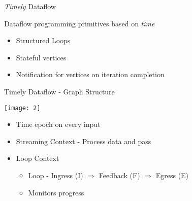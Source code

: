 \begin{frame}[t]{\emph{Timely} Dataflow}
  \begin{center}
    Dataflow programming primitives based on \emph{time}
  \end{center}

  \begin{itemize}
    \setlength\itemsep{0.15cm}
    \item Structured Loops
    \item Stateful vertices
    \item Notification for vertices on iteration completion
  \end{itemize}

  \vspace{0.25cm}
  \begin{center}
  \end{center}
\end{frame}

\begin{frame}[t]{Timely Dataflow - Graph Structure}
  \vspace{-0.5cm}
  \begin{center}
    \texttt{[image: 2]}
  \end{center}

  \vspace{-0.5cm}
  \begin{itemize}
    \setlength\itemsep{0.25cm}
    \item Time epoch on every input
    \item Streaming Context - Process data and pass
    \item Loop Context
    \begin{itemize}
      \setlength\itemsep{0.15cm}
      \item Loop - Ingress (I) $\Rightarrow$ Feedback (F) $\Rightarrow$ Egress (E)
      \item Monitors progress
    \end{itemize}
  \end{itemize}

\end{frame}

